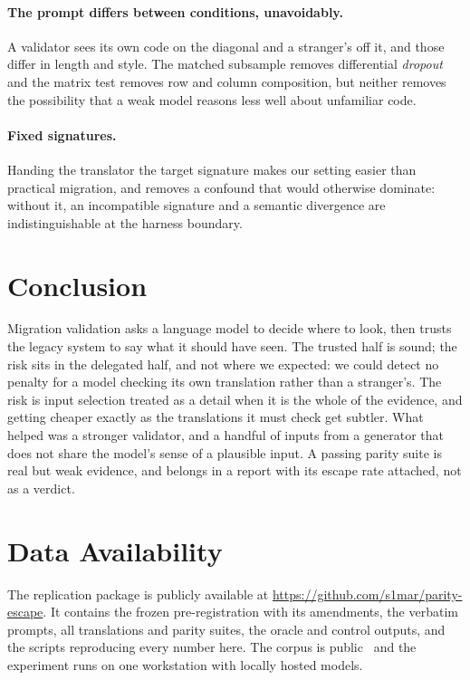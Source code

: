 \documentclass[sigconf]{acmart}
\begin{document}
\paragraph{The prompt differs between conditions, unavoidably.}
A validator sees its own code on the diagonal and a stranger's off it, and those differ in length
and style. The matched subsample removes differential \emph{dropout} and the matrix test removes
row and column composition, but neither removes the possibility that a weak model reasons less
well about unfamiliar code.

\paragraph{Fixed signatures.}
Handing the translator the target signature makes our setting easier than practical migration,
and removes a confound that would otherwise dominate: without it, an incompatible signature
and a semantic divergence are indistinguishable at the harness boundary.

\section{Conclusion}

Migration validation asks a language model to decide where to look, then trusts the legacy
system to say what it should have seen. The trusted half is sound; the risk sits in the
delegated half, and not where we expected: we could detect no penalty for a model checking its
own translation rather than a stranger's. The risk is input selection treated as a detail when
it is the whole of the evidence, and getting cheaper exactly as the translations it must check
get subtler. What helped was a stronger validator, and a handful of inputs from a generator
that does not share the model's sense of a plausible input. A passing parity suite is real but
weak evidence, and belongs in a report with its escape rate attached, not as a verdict.

\section*{Data Availability}

The replication package is publicly available at
\url{https://github.com/s1mar/parity-escape}. It contains the frozen pre-registration with its
amendments, the verbatim prompts, all translations and parity suites, the oracle and control
outputs, and the scripts reproducing every number here. The corpus is
public~\cite{muennighoff2024octopack,chen2021codex} and the experiment runs on one workstation
with locally hosted models.
\end{document}
